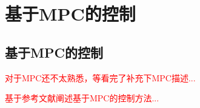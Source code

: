 
\chapter[基于MPC的控制]{基于MPC的控制}
\section[基于MPC的控制]{基于MPC的控制\cite[p2-4]{Neunert_Stauble_Giftthaler_Bellicoso_Carius_Gehring_Hutter_Buchli_2018}}

\textcolor{red}{\small
对于MPC还不太熟悉，等看完了补充下MPC描述...
}

\textcolor{red}{\small
基于参考文献阐述基于MPC的控制方法...
}